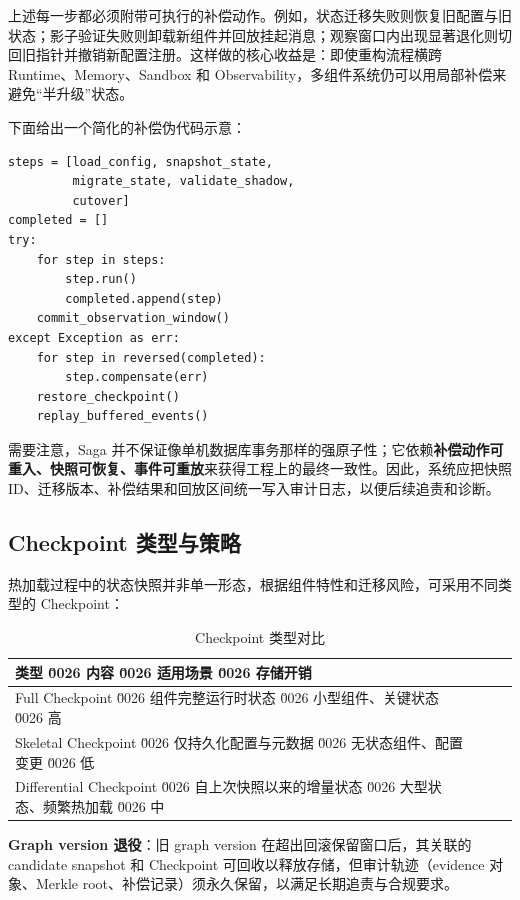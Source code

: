 上述每一步都必须附带可执行的补偿动作。例如，状态迁移失败则恢复旧配置与旧状态；影子验证失败则卸载新组件并回放挂起消息；观察窗口内出现显著退化则切回旧指针并撤销新配置注册。这样做的核心收益是：即使重构流程横跨 Runtime、Memory、Sandbox 和 Observability，多组件系统仍可以用局部补偿来避免“半升级”状态。

下面给出一个简化的补偿伪代码示意：

\begin{verbatim}
steps = [load_config, snapshot_state,
         migrate_state, validate_shadow,
         cutover]
completed = []
try:
    for step in steps:
        step.run()
        completed.append(step)
    commit_observation_window()
except Exception as err:
    for step in reversed(completed):
        step.compensate(err)
    restore_checkpoint()
    replay_buffered_events()
\end{verbatim}

需要注意，Saga 并不保证像单机数据库事务那样的强原子性；它依赖\textbf{补偿动作可重入、快照可恢复、事件可重放}来获得工程上的最终一致性。因此，系统应把快照 ID、迁移版本、补偿结果和回放区间统一写入审计日志，以便后续追责和诊断。

\subsection{Checkpoint 类型与策略}

热加载过程中的状态快照并非单一形态，根据组件特性和迁移风险，可采用不同类型的 Checkpoint：

\begin{table}[htbp]
\centering
\caption{Checkpoint 类型对比}
\label{tab:checkpoint_types}
\begin{tabular}{@{}lp{3.5cm}p{4cm}p{3.5cm}@{}}
\toprule
\textbf{类型} \u0026 \textbf{内容} \u0026 \textbf{适用场景} \u0026 \textbf{存储开销} \\
\midrule
Full Checkpoint \u0026 组件完整运行时状态 \u0026 小型组件、关键状态 \u0026 高 \\
Skeletal Checkpoint \u0026 仅持久化配置与元数据 \u0026 无状态组件、配置变更 \u0026 低 \\
Differential Checkpoint \u0026 自上次快照以来的增量状态 \u0026 大型状态、频繁热加载 \u0026 中 \\
\bottomrule
\end{tabular}
\end{table}

\textbf{Graph version 退役}：旧 graph version 在超出回滚保留窗口后，其关联的 candidate snapshot 和 Checkpoint 可回收以释放存储，但审计轨迹（evidence 对象、Merkle root、补偿记录）须永久保留，以满足长期追责与合规要求。

